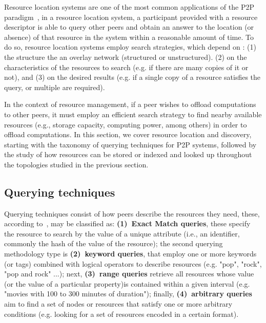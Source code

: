 

Resource location systems are one of the most common applications of the P2P paradigm~\cite{leitaoPHDthesis}, in a resource location system, a participant provided with a resource descriptor is able to query other peers and obtain an answer to the location (or absence) of that resource in the system within a reasonable amount of time. To do so, resource location systems employ search strategies, which depend on : (1) the structure the an overlay network (structured or unstructured). (2) on the characteristics of the resources to search (e.g. if there are many copies of it or not), and (3) on the desired results (e.g. if a single copy of a resource satisfies the query, or multiple are required). 

In the context of resource management, if a peer wishes to offload computations to other peers, it must employ an efficient search strategy to find nearby available resources (e.g., storage capacity, computing power, among others) in order to offload computations. In this section, we cover resource location and discovery, starting with the taxonomy of querying techniques for P2P systems, followed by the study of how resources can be stored or indexed and looked up throughout the topologies studied in the previous section.

\subsection{Querying techniques}

Querying techniques consist of how peers describe the resources they need, these, according to~\cite{leitaoPHDthesis}, may be classified as: \textbf{(1)~Exact Match queries}, these specify the resource to search by the value of a unique attribute (i.e., an identifier, commonly the hash of the value of the resource); the second querying methodology type is \textbf{(2)~keyword queries}, that employ one or more keywords (or tags) combined with logical operators to describe resources (e.g. "pop", "rock", "pop and rock" ...); next, \textbf{(3)~range queries} retrieve all resources whose value (or the value of a particular property)is contained within a given interval (e.g. "movies with 100 to 300 minutes of duration"); finally, \textbf{(4)~arbitrary queries} aim to find a set of nodes or resources that satisfy one or more arbitrary conditions (e.g. looking for a set of resources encoded in a certain format).

